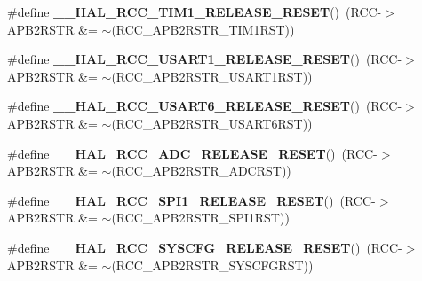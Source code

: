 \begin{DoxyCompactItemize}
\item 
\#define {\bfseries \+\_\+\+\_\+\+H\+A\+L\+\_\+\+R\+C\+C\+\_\+\+T\+I\+M1\+\_\+\+R\+E\+L\+E\+A\+S\+E\+\_\+\+R\+E\+S\+ET}()~(R\+CC-\/$>$A\+P\+B2\+R\+S\+TR \&= $\sim$(R\+C\+C\+\_\+\+A\+P\+B2\+R\+S\+T\+R\+\_\+\+T\+I\+M1\+R\+ST))\hypertarget{group___r_c_c___a_p_b2___force___release___reset_ga1857f223177c9548ce1bae9753e0a7b4}{}\label{group___r_c_c___a_p_b2___force___release___reset_ga1857f223177c9548ce1bae9753e0a7b4}

\item 
\#define {\bfseries \+\_\+\+\_\+\+H\+A\+L\+\_\+\+R\+C\+C\+\_\+\+U\+S\+A\+R\+T1\+\_\+\+R\+E\+L\+E\+A\+S\+E\+\_\+\+R\+E\+S\+ET}()~(R\+CC-\/$>$A\+P\+B2\+R\+S\+TR \&= $\sim$(R\+C\+C\+\_\+\+A\+P\+B2\+R\+S\+T\+R\+\_\+\+U\+S\+A\+R\+T1\+R\+ST))\hypertarget{group___r_c_c___a_p_b2___force___release___reset_ga243061674e38d05d222697046d43813a}{}\label{group___r_c_c___a_p_b2___force___release___reset_ga243061674e38d05d222697046d43813a}

\item 
\#define {\bfseries \+\_\+\+\_\+\+H\+A\+L\+\_\+\+R\+C\+C\+\_\+\+U\+S\+A\+R\+T6\+\_\+\+R\+E\+L\+E\+A\+S\+E\+\_\+\+R\+E\+S\+ET}()~(R\+CC-\/$>$A\+P\+B2\+R\+S\+TR \&= $\sim$(R\+C\+C\+\_\+\+A\+P\+B2\+R\+S\+T\+R\+\_\+\+U\+S\+A\+R\+T6\+R\+ST))\hypertarget{group___r_c_c___a_p_b2___force___release___reset_ga6b60ae1fd712732bea57de27f79a20d3}{}\label{group___r_c_c___a_p_b2___force___release___reset_ga6b60ae1fd712732bea57de27f79a20d3}

\item 
\#define {\bfseries \+\_\+\+\_\+\+H\+A\+L\+\_\+\+R\+C\+C\+\_\+\+A\+D\+C\+\_\+\+R\+E\+L\+E\+A\+S\+E\+\_\+\+R\+E\+S\+ET}()~(R\+CC-\/$>$A\+P\+B2\+R\+S\+TR \&= $\sim$(R\+C\+C\+\_\+\+A\+P\+B2\+R\+S\+T\+R\+\_\+\+A\+D\+C\+R\+ST))\hypertarget{group___r_c_c___a_p_b2___force___release___reset_ga06411259bd987c32186d5851815cbd59}{}\label{group___r_c_c___a_p_b2___force___release___reset_ga06411259bd987c32186d5851815cbd59}

\item 
\#define {\bfseries \+\_\+\+\_\+\+H\+A\+L\+\_\+\+R\+C\+C\+\_\+\+S\+P\+I1\+\_\+\+R\+E\+L\+E\+A\+S\+E\+\_\+\+R\+E\+S\+ET}()~(R\+CC-\/$>$A\+P\+B2\+R\+S\+TR \&= $\sim$(R\+C\+C\+\_\+\+A\+P\+B2\+R\+S\+T\+R\+\_\+\+S\+P\+I1\+R\+ST))\hypertarget{group___r_c_c___a_p_b2___force___release___reset_gad7b4bc8c8a9146529a175c45eecf25e5}{}\label{group___r_c_c___a_p_b2___force___release___reset_gad7b4bc8c8a9146529a175c45eecf25e5}

\item 
\#define {\bfseries \+\_\+\+\_\+\+H\+A\+L\+\_\+\+R\+C\+C\+\_\+\+S\+Y\+S\+C\+F\+G\+\_\+\+R\+E\+L\+E\+A\+S\+E\+\_\+\+R\+E\+S\+ET}()~(R\+CC-\/$>$A\+P\+B2\+R\+S\+TR \&= $\sim$(R\+C\+C\+\_\+\+A\+P\+B2\+R\+S\+T\+R\+\_\+\+S\+Y\+S\+C\+F\+G\+R\+ST))\hypertarget{group___r_c_c___a_p_b2___force___release___reset_ga56de80d50f5ab276ebdeee16a0e2a31b}{}\label{group___r_c_c___a_p_b2___force___release___reset_ga56de80d50f5ab276ebdeee16a0e2a31b}


\end{DoxyCompactItemize}
